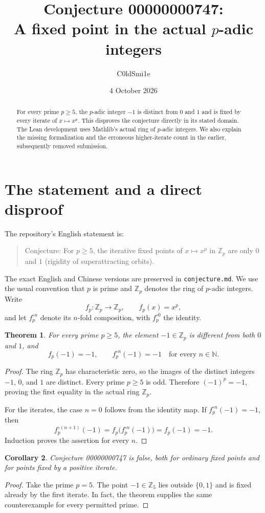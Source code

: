 \documentclass[11pt]{article}
\title{Conjecture 00000000747:\\A fixed point in the actual $p$-adic integers}
\author{C0ldSmi1e}
\date{4 October 2026}
\newtheorem{theorem}{Theorem}
\newtheorem{corollary}[theorem]{Corollary}
\begin{document}
\maketitle
\begin{abstract}
For every prime $p\geq5$, the $p$-adic integer $-1$ is distinct from $0$ and $1$ and is fixed by every iterate of $x\mapsto x^p$. This disproves the conjecture directly in its stated domain. The Lean development uses Mathlib's actual ring of $p$-adic integers. We also explain the missing formalization and the erroneous higher-iterate count in the earlier, subsequently removed submission.
\end{abstract}

\section{The statement and a direct disproof}
The repository's English statement is:
\begin{quote}
Conjecture: For $p\geq5$, the iterative fixed points of $x\mapsto x^p$ in $\mathbb Z_p$ are only $0$ and $1$ (rigidity of superattracting orbits).
\end{quote}
The exact English and Chinese versions are preserved in \texttt{conjecture.md}. We use the usual convention that $p$ is prime and $\mathbb Z_p$ denotes the ring of $p$-adic integers. Write
\[
 f_p:\mathbb Z_p\longrightarrow\mathbb Z_p,\qquad f_p(x)=x^p,
\]
and let $f_p^{\circ n}$ denote its $n$-fold composition, with $f_p^{\circ0}$ the identity.

\begin{theorem}
For every prime $p\geq5$, the element $-1\in\mathbb Z_p$ is different from both $0$ and $1$, and
\[
 f_p(-1)=-1,\qquad f_p^{\circ n}(-1)=-1\quad\text{for every }n\in\mathbb N.
\]
\end{theorem}
\begin{proof}
The ring $\mathbb Z_p$ has characteristic zero, so the images of the distinct integers $-1$, $0$, and $1$ are distinct. Every prime $p\geq5$ is odd. Therefore $(-1)^p=-1$, proving the first equality in the actual ring $\mathbb Z_p$.

For the iterates, the case $n=0$ follows from the identity map. If $f_p^{\circ n}(-1)=-1$, then
\[
 f_p^{\circ(n+1)}(-1)=f_p\bigl(f_p^{\circ n}(-1)\bigr)=f_p(-1)=-1.
\]
Induction proves the assertion for every $n$.
\end{proof}
\begin{corollary}
Conjecture 00000000747 is false, both for ordinary fixed points and for points fixed by a positive iterate.
\end{corollary}
\begin{proof}
Take the prime $p=5$. The point $-1\in\mathbb Z_5$ lies outside $\{0,1\}$ and is fixed already by the first iterate. In fact, the theorem supplies the same counterexample for every permitted prime.
\end{proof}
\end{document}
